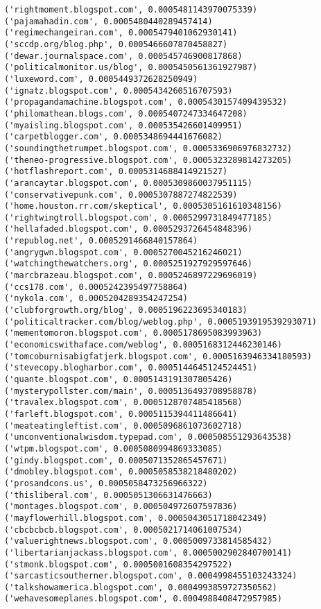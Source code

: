 \documentclass[11pt]{article}
\begin{document}
\begin{Verbatim}[commandchars=\\\{\}]
('rightmoment.blogspot.com', 0.0005481143970075339)
('pajamahadin.com', 0.0005480440289457414)
('regimechangeiran.com', 0.0005479401062930141)
('sccdp.org/blog.php', 0.0005466607870458827)
('dewar.journalspace.com', 0.000545746900817868)
('politicalmonitor.us/blog', 0.0005450561361927987)
('luxeword.com', 0.0005449372628250949)
('ignatz.blogspot.com', 0.0005434260516707593)
('propagandamachine.blogspot.com', 0.0005430157409439532)
('philomathean.blogs.com', 0.0005407247334647208)
('myaisling.blogspot.com', 0.000535426601409951)
('carpetblogger.com', 0.0005348694441676082)
('soundingthetrumpet.blogspot.com', 0.0005336906976832732)
('theneo-progressive.blogspot.com', 0.0005323289814273205)
('hotflashreport.com', 0.0005314688414921527)
('arancaytar.blogspot.com', 0.0005309860037951115)
('conservativepunk.com', 0.0005307887274822539)
('home.houston.rr.com/skeptical', 0.0005305161610348156)
('rightwingtroll.blogspot.com', 0.0005299731849477185)
('hellafaded.blogspot.com', 0.0005293726454848396)
('republog.net', 0.0005291466840157864)
('angrygwn.blogspot.com', 0.0005270045216246021)
('watchingthewatchers.org', 0.0005251927929597646)
('marcbrazeau.blogspot.com', 0.0005246897229696019)
('ccs178.com', 0.0005242395497758864)
('nykola.com', 0.0005204289354247254)
('clubforgrowth.org/blog', 0.0005196223695340183)
('politicaltracker.com/blog/weblog.php', 0.0005193919539293071)
('mementomoron.blogspot.com', 0.0005178695083993963)
('economicswithaface.com/weblog', 0.0005168312446230146)
('tomcoburnisabigfatjerk.blogspot.com', 0.0005163946334180593)
('stevecopy.blogharbor.com', 0.0005144645124524451)
('quante.blogspot.com', 0.0005143191307805426)
('mysterypollster.com/main', 0.0005136493708958878)
('travalex.blogspot.com', 0.0005128707485418568)
('farleft.blogspot.com', 0.0005115394411486641)
('meateatingleftist.com', 0.0005096861073602718)
('unconventionalwisdom.typepad.com', 0.000508551293643538)
('wtpm.blogspot.com', 0.0005080994869333085)
('gindy.blogspot.com', 0.0005071352865457671)
('dmobley.blogspot.com', 0.0005058538218480202)
('prosandcons.us', 0.0005058473256966322)
('thisliberal.com', 0.0005051306631476663)
('montages.blogspot.com', 0.000504972607597836)
('mayflowerhill.blogspot.com', 0.0005043051718042349)
('cbcbcbcb.blogspot.com', 0.0005021714061007534)
('valuerightnews.blogspot.com', 0.0005009733814585432)
('libertarianjackass.blogspot.com', 0.0005002902840700141)
('stmonk.blogspot.com', 0.0005001608354297522)
('sarcasticsoutherner.blogspot.com', 0.0004998455103243324)
('talkshowamerica.blogspot.com', 0.0004993859727350562)
('wehavesomeplanes.blogspot.com', 0.0004988408472957985)

\end{Verbatim}
\end{document}
